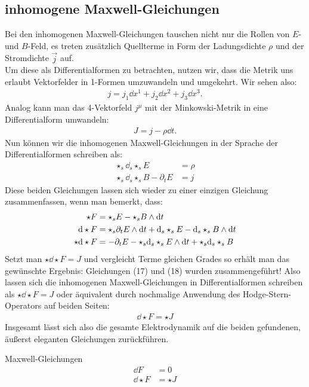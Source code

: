 \subsection{inhomogene Maxwell-Gleichungen}

Bei den inhomogenen Maxwell-Gleichungen tauschen nicht nur die Rollen von $E$- und $B$-Feld, es treten zusätzlich Quellterme in Form der Ladungsdichte $\rho$ und der Stromdichte $\vec{j}$ auf. \\
Um diese als Differentialformen zu betrachten, nutzen wir, dass die Metrik uns erlaubt Vektorfelder in 1-Formen umzuwandeln und umgekehrt. Wir sehen also: 
\begin{align}
j = j_1 \dd x^1 + j_2 \dd x^2 + j_3 \dd x^3. 
\end{align}
Analog kann man das 4-Vektorfeld $j^{\mu}$ mit der Minkowski-Metrik in eine Differentialform umwandeln:
\begin{align}
J = j - \rho \dd t. 
\end{align}
Nun können wir die inhomogenen Maxwell-Gleichungen in der Sprache der Differentialformen schreiben als:
\begin{align}
\star_s \dd_s \star_s E &= \rho \\
\star_s \dd_s \star_s B - \partial_t E &= j
\end{align}
Diese beiden Gleichungen lassen sich wieder zu einer einzigen Gleichung zusammenfassen, wenn man bemerkt, dass:
\begin{align}
\star F &= \star_s E - \star_s B \wedge \dd t \\
\dd \star F &= \star_s \partial_t E  \wedge \dd t + \dd_s \star_s E - \dd_s \star_s B \wedge \dd t \\
\star \dd \star F &= - \partial_t E - \star_s \dd_s \star_s E \wedge \dd t + \star_s \dd_s \star_s B 		
\end{align}
Setzt man $\star \dd \star F = J$ und vergleicht Terme gleichen Grades so erhält man das gewünschte Ergebnis: Gleichungen (17) und (18) wurden zusammengeführt! Also lassen sich die inhomogenen Maxwell-Gleichungen in Differentialformen schreiben als $\star \dd \star F = J$ oder äquivalent durch nochmalige Anwendung des Hodge-Stern-Operators auf beiden Seiten:
\begin{align}
\dd \star F = \star J		
\end{align}
Insgesamt lässt sich also die gesamte Elektrodynamik auf die beiden gefundenen, äußerst eleganten Gleichungen zurückführen.

\begin{mybox}{Maxwell-Gleichungen}
\begin{align*}
\dd F &= 0 \\
\dd \star F &= \star J
\end{align*}
\end{mybox}
